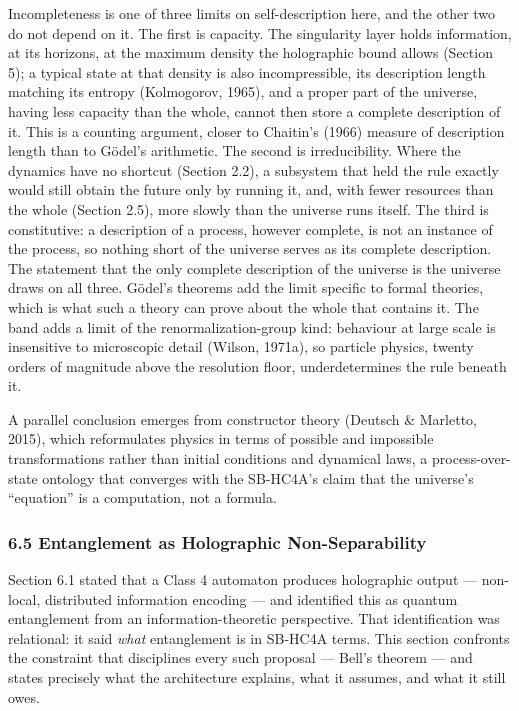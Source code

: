 \documentclass[
]{article}
\begin{document}
Incompleteness is one of three limits on self-description here, and the
other two do not depend on it. The first is capacity. The singularity
layer holds information, at its horizons, at the maximum density the
holographic bound allows (Section 5); a typical state at that density is
also incompressible, its description length matching its entropy
(Kolmogorov, 1965), and a proper part of the universe, having less
capacity than the whole, cannot then store a complete description of it.
This is a counting argument, closer to Chaitin's (1966) measure of
description length than to Gödel's arithmetic. The second is
irreducibility. Where the dynamics have no shortcut (Section 2.2), a
subsystem that held the rule exactly would still obtain the future only
by running it, and, with fewer resources than the whole (Section 2.5),
more slowly than the universe runs itself. The third is constitutive: a
description of a process, however complete, is not an instance of the
process, so nothing short of the universe serves as its complete
description. The statement that the only complete description of the
universe is the universe draws on all three. Gödel's theorems add the
limit specific to formal theories, which is what such a theory can prove
about the whole that contains it. The band adds a limit of the
renormalization-group kind: behaviour at large scale is insensitive to
microscopic detail (Wilson, 1971a), so particle physics, twenty orders
of magnitude above the resolution floor, underdetermines the rule
beneath it.

A parallel conclusion emerges from constructor theory (Deutsch \&
Marletto, 2015), which reformulates physics in terms of possible and
impossible transformations rather than initial conditions and dynamical
laws, a process-over-state ontology that converges with the SB-HC4A's
claim that the universe's ``equation'' is a computation, not a formula.

\hypertarget{entanglement-as-holographic-non-separability}{%
\subsubsection{6.5 Entanglement as Holographic
Non-Separability}\label{entanglement-as-holographic-non-separability}}

Section 6.1 stated that a Class 4 automaton produces holographic output
--- non-local, distributed information encoding --- and identified this
as quantum entanglement from an information-theoretic perspective. That
identification was relational: it said \emph{what} entanglement is in
SB-HC4A terms. This section confronts the constraint that disciplines
every such proposal --- Bell's theorem --- and states precisely what the
architecture explains, what it assumes, and what it still owes.
\end{document}
